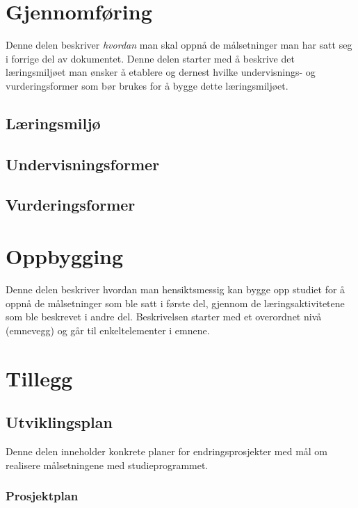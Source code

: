\documentclass[a4paper, oneside, 12pt]{memoir}
\begin{document}
\part{Gjennomføring}

Denne delen beskriver \emph{hvordan} man skal oppnå de målsetninger man har satt seg i forrige del av dokumentet. Denne delen starter med å beskrive det læringsmiljøet man ønsker å etablere og dernest hvilke undervisnings- og vurderingsformer som bør brukes for å bygge dette læringsmiljøet.

	\chapter{Læringsmiljø}
	
	\chapter{Undervisningsformer}
	
	\chapter{Vurderingsformer}

\part{Oppbygging}

Denne delen beskriver hvordan man hensiktsmessig kan bygge opp studiet for å oppnå de målsetninger som ble satt i første del, gjennom de læringsaktivitetene som ble beskrevet i andre del. Beskrivelsen starter med et overordnet nivå (emnevegg) og går til enkeltelementer i emnene.

\appendix

\renewcommand{\appendixtocname}{Tillegg}
\renewcommand{\appendixpagename}{Tillegg}
\part*{Tillegg}

\chapter{Utviklingsplan}

Denne delen inneholder konkrete planer for endringsprosjekter med mål om realisere målsetningene med studieprogrammet.

\section{Prosjektplan}
\end{document}
